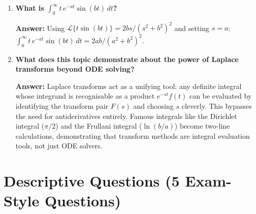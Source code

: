 \documentclass[12pt,a4paper]{article}
\begin{document}
\begin{enumerate}[label=\textbf{Q\arabic*.}, leftmargin=*, itemsep=1.2em]
\textbf{Answer:} When $F(s) \to \infty$ as $s \to 0^+$. For example,
$\mathcal{L}\{1\} = 1/s$, so $F(0)$ diverges and $\int_0^\infty 1\,dt$ is
indeed infinite. Similarly, $\mathcal{L}\{\cos t\} = s/(s^2+1)$ and
$F(0) = 0$ correctly gives $\int_0^\infty e^{-0\cdot t}\cos t\,dt$, but the
integral $\int_0^\infty \cos t\,dt$ itself does not converge --- so one must
be careful about the distinction between the limit as $s \to 0^+$ being finite
and the original integral converging.

\item \textbf{What is $\int_0^\infty t\,e^{-at}\sin(bt)\,dt$?}

\textbf{Answer:} Using $\mathcal{L}\{t\sin(bt)\} = 2bs/(s^2+b^2)^2$ and
setting $s = a$:
$\int_0^\infty t\,e^{-at}\sin(bt)\,dt = 2ab/(a^2+b^2)^2$.

\item \textbf{What does this topic demonstrate about the power of Laplace
      transforms beyond ODE solving?}

\textbf{Answer:} Laplace transforms act as a unifying tool: any definite
integral whose integrand is recognisable as a product $e^{-st} f(t)$ can be
evaluated by identifying the transform pair $F(s)$ and choosing $s$ cleverly.
This bypasses the need for antiderivatives entirely. Famous integrals like the
Dirichlet integral ($\pi/2$) and the Frullani integral ($\ln(b/a)$) become
two-line calculations, demonstrating that transform methods are integral
evaluation tools, not just ODE solvers.

\end{enumerate}

\section{Descriptive Questions (5 Exam-Style Questions)}
\end{document}
